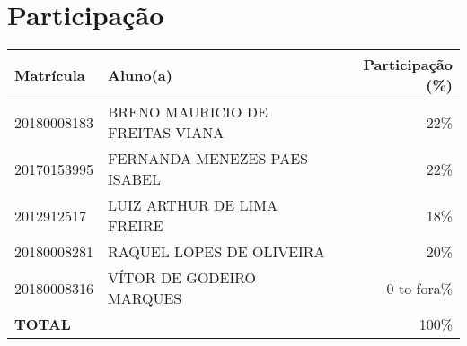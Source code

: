 \documentclass[12pt]{report}
\begin{document}
\chapter{Participação}
\begin{table}[h]
	\centering
	\label{my-label}
	\begin{tabular}{|l|l|r|}
		\hline
		\textbf{Matrícula} & \textbf{Aluno(a)} & \textbf{Participação (\%)} \\ \hline
		20180008183        & BRENO MAURICIO DE FREITAS VIANA & 22\%                       \\ \hline
		20170153995        & FERNANDA MENEZES PAES ISABEL    & 22\%                       \\ \hline
		2012912517         & LUIZ ARTHUR DE LIMA FREIRE      & 18\%                       \\ \hline
		20180008281        & RAQUEL LOPES DE OLIVEIRA        & 20\%                       \\ \hline
		20180008316        & VÍTOR DE GODEIRO MARQUES        & 0 to fora\%                       \\ \hline
		\multicolumn{2}{|l|}{\textbf{TOTAL}}            & 100\%                      \\ \hline
	\end{tabular}
\end{table}

\nocite{*}


\end{document}
